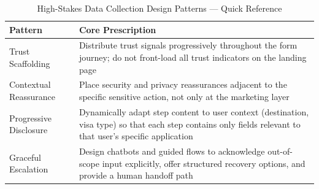 \documentclass[journal, 10pt, twoside]{IEEEtran}
\begin{document}
\begin{table}[ht]
  \centering
  \caption{High-Stakes Data Collection Design Patterns — Quick Reference}
  \label{tab:patterns}
  \begin{tabular}{@{}p{2.2cm} p{5.2cm}@{}}
    \toprule
    \textbf{Pattern} & \textbf{Core Prescription} \\
    \midrule
    Trust Scaffolding & Distribute trust signals progressively
                        throughout the form journey; do not front-load
                        all trust indicators on the landing page \\
    Contextual Reassurance & Place security and privacy reassurances
                        adjacent to the specific sensitive action,
                        not only at the marketing layer \\
    Progressive Disclosure & Dynamically adapt step content to user
                        context (destination, visa type) so that each
                        step contains only fields relevant to that
                        user's specific application \\
    Graceful Escalation & Design chatbots and guided flows to
                        acknowledge out-of-scope input explicitly,
                        offer structured recovery options, and
                        provide a human handoff path \\
    \bottomrule
  \end{tabular}
\end{table}
\end{document}
